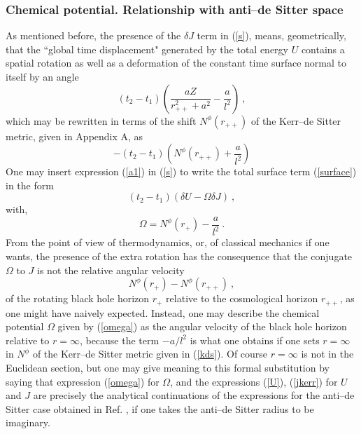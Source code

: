\documentclass[a4paper,preprintnumbers,amsmath,amssymb]{revtex4}
\begin{document}
\subsubsection*{Chemical potential. Relationship with anti--de Sitter space}

As mentioned before, the presence of the $\delta J$ term in (\ref{s}), means, geometrically,
that the ``global time displacement" generated by the total energy $U$ contains a spatial rotation as well as a deformation
of the constant time surface normal to itself by an angle
\begin{equation}
 (t_2-t_1) \left(\frac{aZ}{r_{++}^2+a^2} - \frac{a}{l^2}  \right) \ ,
\label{a1}
\end{equation}
which may be rewritten in terms of the shift $N^{\phi}(r_{++})$ of the Kerr--de Sitter metric,
given in Appendix A, as
\begin{equation}
-(t_2-t_1) \left(N^{\phi}(r_{++}) + \frac{a}{l^2}\right)
\label{a2}
\end{equation}
One may insert expression (\ref{a1}) in (\ref{s}) to write the total surface term (\ref{surface}) in the form
\begin{equation}
(t_2-t_1)(\delta U - \Omega \delta J) \ ,
\label{surface2}
\end{equation}
with,
\begin{equation}
\Omega = N^{\phi}(r_+) - \frac{a}{l^2} \ .
\label{omega}
\end{equation}
From the point of view of thermodynamics, or, of  classical mechanics if one wants, the presence of the extra rotation has the consequence that the conjugate $\Omega$ to $J$ is not the relative angular velocity
\begin{equation}
N^{\phi}(r_{+}) - N^{\phi}(r_{++}) \ ,
\label{dif}
\end{equation}
of the rotating black hole horizon $r_+$ relative to the cosmological horizon $r_{++}$, as one might have naively expected.
Instead, one may describe the chemical potential $\Omega$ given by (\ref{omega}) as the angular velocity of the black hole horizon relative to
$r=\infty$, because the term $-a/l^2$ is what one obtains if one sets $r=\infty$ in $N^\phi$ of the Kerr--de Sitter metric given in (\ref{kds}). Of course
$r=\infty$ is not in the Euclidean section, but one may give meaning to this formal substitution by saying that expression (\ref{omega}) for $\Omega$, and the expressions (\ref{U}), (\ref{jkerr}) for $U$ and $J$ are precisely the analytical continuations of the expressions for the anti--de Sitter case obtained in Ref. \cite{HT}, if one takes the anti--de Sitter radius to be imaginary.
\end{document}
